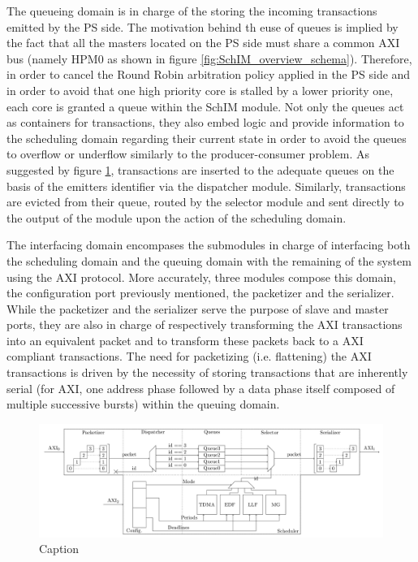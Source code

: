        The queueing domain is in charge of the storing the incoming transactions emitted by the PS side.
        The motivation behind th euse of queues is implied by the fact that all the masters located on the PS side must share a common AXI bus (namely HPM0 as shown in figure \ref{fig:SchIM_overview_schema}).
        Therefore, in order to cancel the Round Robin arbitration policy applied in the PS side and in order to avoid that one high priority core is stalled by a lower priority one, each core is granted a queue within the SchIM module.
        Not only the queues act as containers for transactions, they also embed logic and provide information to the scheduling domain regarding their current state in order to avoid the queues to overflow or underflow similarly to the producer-consumer problem.
        As suggested by figure \ref{fig:MemorEDF_module_schema}, transactions are inserted to the adequate queues on the basis of the emitters identifier via the dispatcher module.
        Similarly, transactions are evicted from their queue, routed by the selector module and sent directly to the output of the module upon the action of the scheduling domain.

        The interfacing domain encompases the submodules in charge of interfacing both the scheduling domain and the queuing domain with the remaining of the system using the AXI protocol.
        More accurately, three modules compose this domain, the configuration port previously mentioned, the packetizer and the serializer.
        While the packetizer and the serializer serve the purpose of slave and master ports, they are also in charge of respectively transforming the AXI transactions into an equivalent packet and to transform these packets back to a AXI compliant transactions.
        The need for packetizing (i.e. flattening) the AXI transactions is driven by the necessity of storing transactions that are inherently serial (for AXI, one address phase followed by a data phase itself composed of multiple successive bursts) within the queuing domain.

        \begin{figure}
            \centering
            \includegraphics[scale=0.08]{images/MemorEDF_module_schema.png}
            \caption{Caption}
            \label{fig:MemorEDF_module_schema}
        \end{figure}

